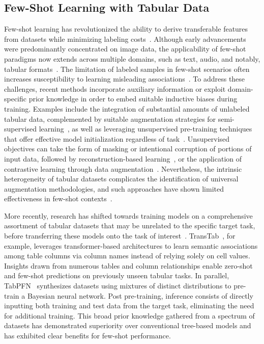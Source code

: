 \subsection{Few-Shot Learning with Tabular Data} Few-shot learning has revolutionized the ability to derive transferable features from datasets while minimizing labeling costs~\cite{chen2018closer}. Although early advancements were predominantly concentrated on image data, the applicability of few-shot paradigms now extends across multiple domains, such as text, audio, and notably, tabular formats~\cite{majumder2022few,nam2023stunt,schick2021exploiting}. The limitation of labeled samples in few-shot scenarios often increases susceptibility to learning misleading associations~\cite{bartlett2021deep}. To address these challenges, recent methods incorporate auxiliary information or exploit domain-specific prior knowledge in order to embed suitable inductive biases during training. Examples include the integration of substantial amounts of unlabeled tabular data, complemented by suitable augmentation strategies for semi-supervised learning~\cite{ucar2021subtab,yoon2020vime}, as well as leveraging unsupervised pre-training techniques that offer effective model initialization regardless of task~\cite{somepalli2021saint}. Unsupervised objectives can take the form of masking or intentional corruption of portions of input data, followed by reconstruction-based learning~\cite{arik2021tabnet,majmundar2022met}, or the application of contrastive learning through data augmentation~\cite{bahri2022scarf,chen2020simple}. Nevertheless, the intrinsic heterogeneity of tabular datasets complicates the identification of universal augmentation methodologies, and such approaches have shown limited effectiveness in few-shot contexts~\cite{nam2023stunt}.

More recently, research has shifted towards training models on a comprehensive assortment of tabular datasets that may be unrelated to the specific target task, before transferring these models onto the task of interest~\cite{zhang2023generative,levin2022transfer,zhu2023xtab}. TransTab~\cite{wang2022transtab}, for example, leverages transformer-based architectures to learn semantic associations among table columns via column names instead of relying solely on cell values. Insights drawn from numerous tables and column relationships enable zero-shot and few-shot predictions on previously unseen tabular tasks. In parallel, TabPFN~\cite{hollmann2022tabpfn} synthesizes datasets using mixtures of distinct distributions to pre-train a Bayesian neural network. Post pre-training, inference consists of directly inputting both training and test data from the target task, eliminating the need for additional training. This broad prior knowledge gathered from a spectrum of datasets has demonstrated superiority over conventional tree-based models and has exhibited clear benefits for few-shot performance.

